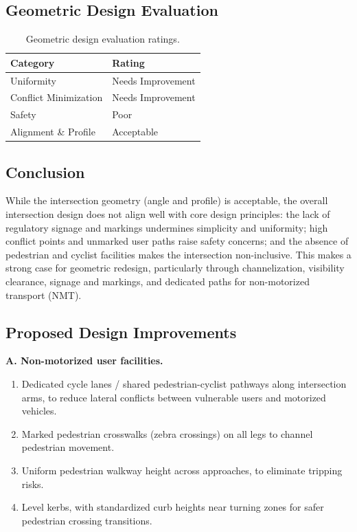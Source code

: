 \documentclass[11pt]{article}
\begin{document}
\subsection{Geometric Design Evaluation}
\begin{table}[H]
  \centering
  \caption{Geometric design evaluation ratings.}
  \begin{tabular}{@{}ll@{}}
    \toprule
    \textbf{Category} & \textbf{Rating} \\
    \midrule
    Uniformity            & Needs Improvement \\
    Conflict Minimization & Needs Improvement \\
    Safety                & Poor \\
    Alignment \& Profile  & Acceptable \\
    \bottomrule
  \end{tabular}
\end{table}

\subsection{Conclusion}
While the intersection geometry (angle and profile) is acceptable, the overall intersection design does
not align well with core design principles: the lack of regulatory signage and markings undermines
simplicity and uniformity; high conflict points and unmarked user paths raise safety concerns; and the
absence of pedestrian and cyclist facilities makes the intersection non-inclusive. This makes a strong
case for geometric redesign, particularly through channelization, visibility clearance, signage and
markings, and dedicated paths for non-motorized transport (NMT).

\subsection{Proposed Design Improvements}

\textbf{A. Non-motorized user facilities.}
\begin{enumerate}
  \item Dedicated cycle lanes / shared pedestrian-cyclist pathways along intersection arms, to reduce
  lateral conflicts between vulnerable users and motorized vehicles.
  \item Marked pedestrian crosswalks (zebra crossings) on all legs to channel pedestrian movement.
  \item Uniform pedestrian walkway height across approaches, to eliminate tripping risks.
  \item Level kerbs, with standardized curb heights near turning zones for safer pedestrian crossing
  transitions.
\end{enumerate}
\end{document}

